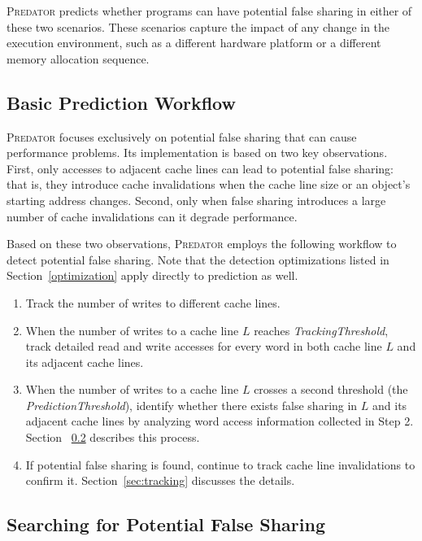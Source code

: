 \documentclass[10pt]{sigplanconf}
\newcommand{\Predator}{{\scshape Predator}}
\begin{document}
\Predator{} predicts whether programs can have potential false sharing  
in either of these two scenarios. These scenarios capture the impact of any change in the execution environment, such as a different hardware platform or a different memory allocation sequence.

\subsection{Basic Prediction Workflow}
\label{sec:predictionmechanism} 

\Predator{} focuses exclusively on potential false sharing that can 
cause performance problems.
Its implementation is based on
two key observations. First, only accesses to 
adjacent cache lines can lead to potential false sharing: 
that is, they introduce cache invalidations when the cache line size
or an object's starting address changes.
Second, only when false sharing introduces a large number of cache invalidations
can it degrade performance.

Based on these two observations, \Predator{} employs 
the following workflow to detect potential false sharing.
Note that the detection optimizations listed in Section~\ref{optimization} apply directly to prediction as well.

\begin{enumerate}
\item
Track the number of writes to different cache lines. 

\item
When the number of writes to a cache line $L$ reaches {\it TrackingThreshold},
track detailed read and write accesses for every word in both cache line $L$ 
and its adjacent cache lines. 

\item
When the number of writes to a cache line $L$ crosses a second threshold (the 
{\it PredictionThreshold}), 
identify whether there exists false sharing in $L$ and its adjacent 
cache lines by analyzing word access information collected in Step 2. 
Section ~\ref{sec:evaluatingfs} describes this process.

\item
If potential false sharing is found, continue to track cache line invalidations to confirm it. Section~\ref{sec:tracking} discusses the details.

\end{enumerate}

\subsection{Searching for Potential False Sharing}
\label{sec:evaluatingfs}
\end{document}
